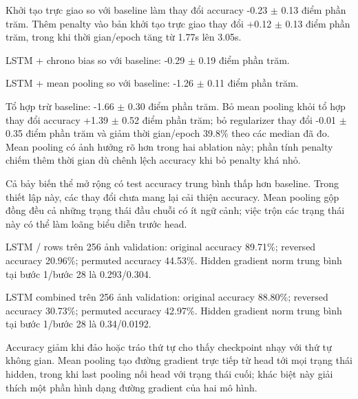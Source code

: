 Khởi tạo trực giao so với baseline làm thay đổi accuracy -0.23 $\pm$ 0.13 điểm phần trăm. Thêm penalty vào bản khởi tạo trực giao thay đổi +0.12 $\pm$ 0.13 điểm phần trăm, trong khi thời gian/epoch tăng từ 1.77s lên 3.05s.

LSTM + chrono bias so với baseline: -0.29 $\pm$ 0.19 điểm phần trăm.

LSTM + mean pooling so với baseline: -1.26 $\pm$ 0.11 điểm phần trăm.

Tổ hợp trừ baseline: -1.66 $\pm$ 0.30 điểm phần trăm. Bỏ mean pooling khỏi tổ hợp thay đổi accuracy +1.39 $\pm$ 0.52 điểm phần trăm; bỏ regularizer thay đổi -0.01 $\pm$ 0.35 điểm phần trăm và giảm thời gian/epoch 39.8\% theo các median đã đo. Mean pooling có ảnh hưởng rõ hơn trong hai ablation này; phần tính penalty chiếm thêm thời gian dù chênh lệch accuracy khi bỏ penalty khá nhỏ.

Cả bảy biến thể mở rộng có test accuracy trung bình thấp hơn baseline. Trong thiết lập này, các thay đổi chưa mang lại cải thiện accuracy. Mean pooling gộp đồng đều cả những trạng thái đầu chuỗi có ít ngữ cảnh; việc trộn các trạng thái này có thể làm loãng biểu diễn trước head.

LSTM / rows trên 256 ảnh validation: original accuracy 89.71\%; reversed accuracy 20.96\%; permuted accuracy 44.53\%. Hidden gradient norm trung bình tại bước 1/bước 28 là 0.293/0.304.

LSTM combined trên 256 ảnh validation: original accuracy 88.80\%; reversed accuracy 30.73\%; permuted accuracy 42.97\%. Hidden gradient norm trung bình tại bước 1/bước 28 là 0.34/0.0192.

Accuracy giảm khi đảo hoặc tráo thứ tự cho thấy checkpoint nhạy với thứ tự không gian. Mean pooling tạo đường gradient trực tiếp từ head tới mọi trạng thái hidden, trong khi last pooling nối head với trạng thái cuối; khác biệt này giải thích một phần hình dạng đường gradient của hai mô hình.
